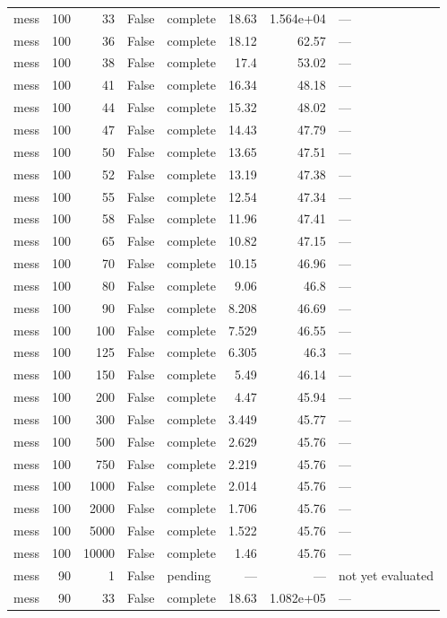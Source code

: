 \begin{tabular}{lrrrlrrl}
mess & 100 & 33 & False & complete & 18.63 & 1.564e+04 & — \\
mess & 100 & 36 & False & complete & 18.12 & 62.57 & — \\
mess & 100 & 38 & False & complete & 17.4 & 53.02 & — \\
mess & 100 & 41 & False & complete & 16.34 & 48.18 & — \\
mess & 100 & 44 & False & complete & 15.32 & 48.02 & — \\
mess & 100 & 47 & False & complete & 14.43 & 47.79 & — \\
mess & 100 & 50 & False & complete & 13.65 & 47.51 & — \\
mess & 100 & 52 & False & complete & 13.19 & 47.38 & — \\
mess & 100 & 55 & False & complete & 12.54 & 47.34 & — \\
mess & 100 & 58 & False & complete & 11.96 & 47.41 & — \\
mess & 100 & 65 & False & complete & 10.82 & 47.15 & — \\
mess & 100 & 70 & False & complete & 10.15 & 46.96 & — \\
mess & 100 & 80 & False & complete & 9.06 & 46.8 & — \\
mess & 100 & 90 & False & complete & 8.208 & 46.69 & — \\
mess & 100 & 100 & False & complete & 7.529 & 46.55 & — \\
mess & 100 & 125 & False & complete & 6.305 & 46.3 & — \\
mess & 100 & 150 & False & complete & 5.49 & 46.14 & — \\
mess & 100 & 200 & False & complete & 4.47 & 45.94 & — \\
mess & 100 & 300 & False & complete & 3.449 & 45.77 & — \\
mess & 100 & 500 & False & complete & 2.629 & 45.76 & — \\
mess & 100 & 750 & False & complete & 2.219 & 45.76 & — \\
mess & 100 & 1000 & False & complete & 2.014 & 45.76 & — \\
mess & 100 & 2000 & False & complete & 1.706 & 45.76 & — \\
mess & 100 & 5000 & False & complete & 1.522 & 45.76 & — \\
mess & 100 & 10000 & False & complete & 1.46 & 45.76 & — \\
mess & 90 & 1 & False & pending & — & — & not yet evaluated \\
mess & 90 & 33 & False & complete & 18.63 & 1.082e+05 & — \\

\end{tabular}
